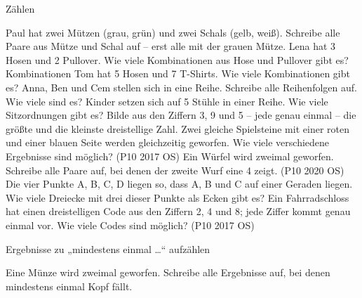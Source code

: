 \setcounter{aufgabe}{7}

\begin{aufgabe}{Zählen}
\begin{teile}
\teil Paul hat zwei Mützen (grau, grün) und zwei Schals (gelb, weiß). Schreibe alle Paare aus Mütze und Schal auf – erst alle mit der grauen Mütze.
\teil Lena hat 3 Hosen und 2 Pullover. Wie viele Kombinationen aus Hose und Pullover gibt es? \leerfeld Kombinationen
\teil Tom hat 5 Hosen und 7 T-Shirts. Wie viele Kombinationen gibt es?
\teil Anna, Ben und Cem stellen sich in eine Reihe. Schreibe alle Reihenfolgen auf. Wie viele sind es?
 Kinder setzen sich auf 5 Stühle in einer Reihe. Wie viele Sitzordnungen gibt es?
\teil Bilde aus den Ziffern 3, 9 und 5 – jede genau einmal – die größte und die kleinste dreistellige Zahl.
\teil Zwei gleiche Spielsteine mit einer roten und einer blauen Seite werden gleichzeitig geworfen. Wie viele verschiedene Ergebnisse sind möglich? \hfill (P10 2017 OS)
\teil Ein Würfel wird zweimal geworfen. Schreibe alle Paare auf, bei denen der zweite Wurf eine 4 zeigt. \hfill (P10 2020 OS)
\teil Die vier Punkte A, B, C, D liegen so, dass A, B und C auf einer Geraden liegen. Wie viele Dreiecke mit drei dieser Punkte als Ecken gibt es?
\teil Ein Fahrradschloss hat einen dreistelligen Code aus den Ziffern 2, 4 und 8; jede Ziffer kommt genau einmal vor. Wie viele Codes sind möglich? \hfill (P10 2017 OS)
\end{teile}
\end{aufgabe}

\begin{aufgabe}{Ergebnisse zu „mindestens einmal …“ aufzählen}
\begin{teile}
\teil Eine Münze wird zweimal geworfen. Schreibe alle Ergebnisse auf, bei denen mindestens einmal Kopf fällt.
\end{teile}
\end{aufgabe}

